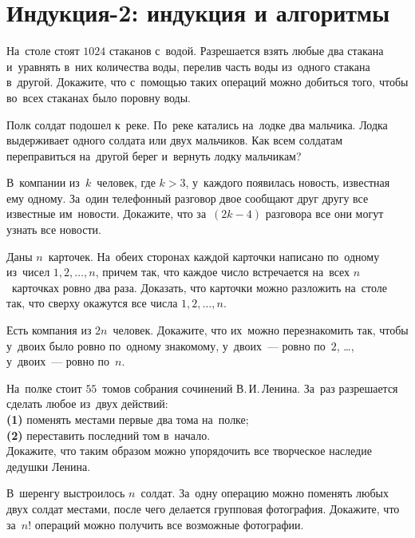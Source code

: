 
\section*{Индукция-2: индукция и алгоритмы}


\begin{problems}

\item
На~столе стоят $1024$ стаканов с~водой.
Разрешается взять любые два стакана и~уравнять в~них количества воды, перелив
часть воды из~одного стакана в~другой.
Докажите, что с~помощью таких операций можно добиться того, чтобы во~всех
стаканах было поровну воды.

\item
Полк солдат подошел к~реке.
По~реке катались на~лодке два мальчика.
Лодка выдерживает одного солдата или двух мальчиков.
Как всем солдатам переправиться на~другой берег и~вернуть лодку мальчикам?

\item
В~компании из~$k$~человек, где $k > 3$, у~каждого появилась новость, известная
ему одному.
За~один телефонный разговор двое сообщают друг другу все известные им~новости.
Докажите, что за~$(2 k - 4)$ разговора все они могут узнать все новости.

\item
Даны $n$~карточек.
На~обеих сторонах каждой карточки написано по~одному из~чисел
$1, 2, \ldots, n$, причем так, что каждое число встречается на~всех
$n$~карточках ровно два раза.
Доказать, что карточки можно разложить на~столе так, что сверху окажутся все
числа $1, 2, \ldots, n$.

\item
Есть компания из $2 n$~человек.
Докажите, что их~можно перезнакомить так, чтобы у~двоих было ровно по~одному
знакомому, у~двоих~--- ровно по~$2$, \ldots, у~двоих~--- ровно по~$n$.

\item
На~полке стоит $55$~томов собрания сочинений В.\,И.\,Ленина.
За~раз разрешается сделать любое из~двух действий:
\\
\textbf{(1)} поменять местами первые два тома на~полке;
\\
\textbf{(2)} переставить последний том в~начало.
\\
Докажите, что таким образом можно упорядочить все творческое наследие дедушки
Ленина.

\item
В~шеренгу выстроилось $n$~солдат.
За~одну операцию можно поменять любых двух солдат местами, после чего делается
групповая фотография.
Докажите, что за~$n!$ операций можно получить все возможные фотографии.

\end{problems}

